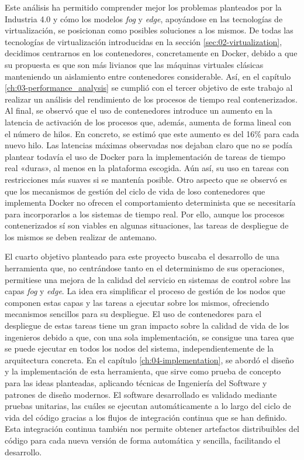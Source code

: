 Este análisis ha permitido comprender mejor los problemas planteados por la
Industria 4.0 y cómo los modelos \textit{fog} y \textit{edge}, apoyándose en las
tecnologías de virtualización, se posicionan como posibles soluciones a los
mismos. De todas las tecnologías de virtualización introducidas en la sección
\ref{sec:02-virtualization}, decidimos centrarnos en los contenedores,
concretamente en Docker, debido a que su propuesta es que son más livianos que
las máquinas virtuales clásicas manteniendo un aislamiento entre contenedores
considerable. Así, en el capítulo \ref{ch:03-performance_analysis} se cumplió
con el tercer objetivo de este trabajo al realizar un análisis del rendimiento
de los procesos de tiempo real contenerizados. Al final, se observó que el uso
de contenedores introduce un aumento en la latencia de activación de los
procesos que, además, aumenta de forma lineal con el número de hilos. En
concreto, se estimó que este aumento es del 16\% para cada nuevo hilo. Las
latencias máximas observadas nos dejaban claro que no se podía plantear todavía
el uso de Docker para la implementación de tareas de tiempo real «duras», al
menos en la plataforma escogida. Aún así, su uso en tareas con restricciones más
suaves si se mantenía posible. Otro aspecto que se observó es que los mecanismos
de gestión del ciclo de vida de loso contenedores que implementa Docker no
ofrecen el comportamiento determinista que se necesitaría para incorporarlos a
los sistemas de tiempo real. Por ello, aunque los procesos contenerizados sí son
viables en algunas situaciones, las tareas de despliegue de los mismos se deben
realizar de antemano.

El cuarto objetivo planteado para este proyecto buscaba el desarrollo de una
herramienta que, no centrándose tanto en el determinismo de sus operaciones,
permitiese una mejora de la calidad del servicio en sistemas de control sobre
las capas \textit{fog} y \textit{edge}. La idea era simplificar el proceso de
gestión de los nodos que componen estas capas y las tareas a ejecutar sobre los
mismos, ofreciendo mecanismos sencillos para su despliegue. El uso de
contenedores para el despliegue de estas tareas tiene un gran impacto sobre la
calidad de vida de los ingenieros debido a que, con una sola implementación, se
consigue una tarea que se puede ejecutar en todos los nodos del sistema,
independientemente de la arquitectura concreta. En el capítulo
\ref{ch:04-implementation}, se abordó el diseño y la implementación de esta
herramienta, que sirve como prueba de concepto para las ideas planteadas,
aplicando técnicas de Ingeniería del Software y patrones de diseño modernos. El
software desarrollado es validado mediante pruebas unitarias, las cuáles se
ejecutan automáticamente a lo largo del ciclo de vida del código gracias a los
flujos de integración continua que se han definido. Esta integración continua
también nos permite obtener artefactos distribuibles del código para cada nueva
versión de forma automática y sencilla, facilitando el desarrollo.

